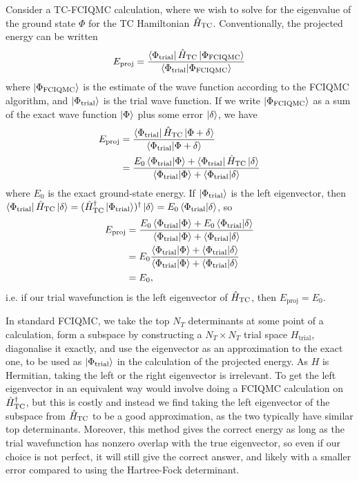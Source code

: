 Consider a TC-FCIQMC calculation, where we wish to solve for the eigenvalue of the ground state $\Phi$ for the TC Hamiltonian $\hat H_\mathrm{TC}$. Conventionally, the projected energy can be written
\begin{equation}
    E_\mathrm{proj} = \frac{\bra{\Phi_\mathrm{trial}}\hat H_\mathrm{TC}\ket{\Phi_\mathrm{FCIQMC}}}{\braket{\Phi_\mathrm{trial}}{\Phi_\mathrm{FCIQMC}}}
\end{equation}
where $\ket{\Phi_\mathrm{FCIQMC}}$ is the estimate of the wave function according to the FCIQMC algorithm, and $\ket{\Phi_\mathrm{trial}}$ is the trial wave function. If we write $\ket{\Phi_\mathrm{FCIQMC}}$ as a sum of the exact wave function $\ket{\Phi}$ plus some error $\ket\delta$, we have
\begin{align}
    E_\mathrm{proj} &= \frac{\bra{\Phi_\mathrm{trial}}\hat H_\mathrm{TC}\ket{\Phi+\delta}}{\braket{\Phi_\mathrm{trial}}{\Phi+\delta}} \\
    &= \frac{E_0\braket{\Phi_\mathrm{trial}}{\Phi}+\bra{\Phi_\mathrm{trial}}\hat H_\mathrm{TC}\ket{\delta}}{\braket{\Phi_\mathrm{trial}}{\Phi}+\braket{\Phi_\mathrm{trial}}{\delta}}
\end{align}
where $E_0$ is the exact ground-state energy.
If $\ket{\Phi_\mathrm{trial}}$ is the left eigenvector, then $\bra{\Phi_\mathrm{trial}}\hat H_\mathrm{TC}\ket{\delta}=(\hat H_\mathrm{TC}^\dag\ket{\Phi_\mathrm{trial}})^\dag\ket{\delta}=E_0\braket{\Phi_\mathrm{trial}}{\delta}$, so
\begin{align}
    E_\mathrm{proj} &= \frac{E_0\braket{\Phi_\mathrm{trial}}{\Phi}+E_0\braket{\Phi_\mathrm{trial}}{\delta}}{\braket{\Phi_\mathrm{trial}}{\Phi}+\braket{\Phi_\mathrm{trial}}{\delta}}\\&=E_0\frac{\braket{\Phi_\mathrm{trial}}{\Phi}+\braket{\Phi_\mathrm{trial}}{\delta}}{\braket{\Phi_\mathrm{trial}}{\Phi}+\braket{\Phi_\mathrm{trial}}{\delta}}\\&=E_0,
\end{align}
i.e. if our trial wavefunction is the left eigenvector of $\hat H_\mathrm{TC}$, then $E_\mathrm{proj}=E_0$.

In standard FCIQMC, we take the top $N_T$ determinants at some point of a calculation, form a subspace by constructing a $N_T\times N_T$ trial space $H_\mathrm{trial}$, diagonalise it exactly, and use the eigenvector as an approximation to the exact one, to be used as $\ket{\Phi_\mathrm{trial}}$ in the calculation of the projected energy. As $H$ is Hermitian, taking the left or the right eigenvector is irrelevant. To get the left eigenvector in an equivalent way would involve doing a FCIQMC calculation on $\hat H_\mathrm{TC}^\dag$, but this is costly and instead we find taking the left eigenvector of the subspace from $\hat H_\mathrm{TC}$ to be a good approximation, as the two typically have similar top determinants. Moreover, this method gives the correct energy as long as the trial wavefunction has nonzero overlap with the true eigenvector, so even if our choice is not perfect, it will still give the correct answer, and likely with a smaller error compared to using the Hartree-Fock determinant.

